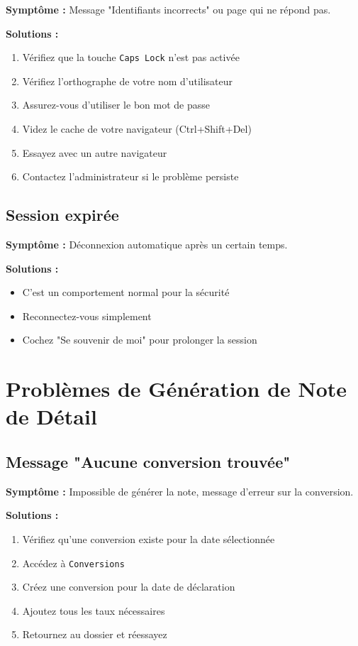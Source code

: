 \documentclass[12pt,a4paper]{report}
\begin{document}
\textbf{Symptôme :} Message "Identifiants incorrects" ou page qui ne répond pas.

\textbf{Solutions :}

\begin{enumerate}[leftmargin=*]
    \item Vérifiez que la touche \texttt{Caps Lock} n'est pas activée
    \item Vérifiez l'orthographe de votre nom d'utilisateur
    \item Assurez-vous d'utiliser le bon mot de passe
    \item Videz le cache de votre navigateur (Ctrl+Shift+Del)
    \item Essayez avec un autre navigateur
    \item Contactez l'administrateur si le problème persiste
\end{enumerate}

\subsection{Session expirée}

\textbf{Symptôme :} Déconnexion automatique après un certain temps.

\textbf{Solutions :}

\begin{itemize}[leftmargin=*]
    \item C'est un comportement normal pour la sécurité
    \item Reconnectez-vous simplement
    \item Cochez "Se souvenir de moi" pour prolonger la session
\end{itemize}

\section{Problèmes de Génération de Note de Détail}

\subsection{Message "Aucune conversion trouvée"}

\textbf{Symptôme :} Impossible de générer la note, message d'erreur sur la conversion.

\textbf{Solutions :}

\begin{enumerate}[leftmargin=*]
    \item Vérifiez qu'une conversion existe pour la date sélectionnée
    \item Accédez à \texttt{Conversions}
    \item Créez une conversion pour la date de déclaration
    \item Ajoutez tous les taux nécessaires
    \item Retournez au dossier et réessayez
\end{enumerate}
\end{document}
